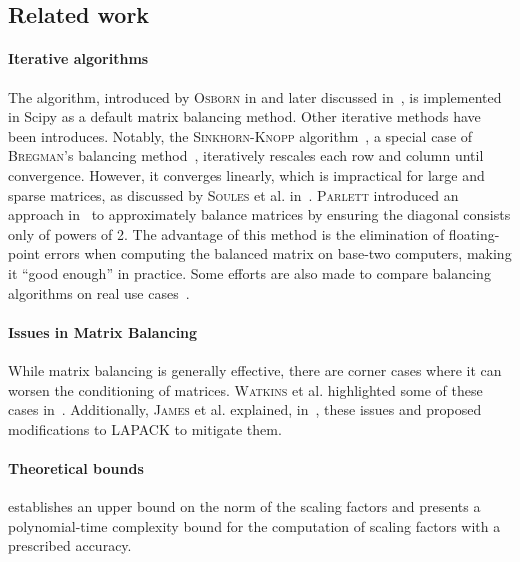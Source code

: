 
\subsection{Related work}

\paragraph*{Iterative algorithms} The  algorithm, introduced by \textsc{Osborn} in \cite{osborne1960pre} and later discussed in~\cite{parlett1971balancing}, is implemented in Scipy as a default matrix balancing method. Other iterative methods have been introduces. Notably, the \textsc{Sinkhorn-Knopp} algorithm~\cite{sinkhorn1967concerning}, a special case of \textsc{Bregman}’s balancing method~\cite{lamond1981bregman}, iteratively rescales each row and column until convergence. However, it converges linearly, which is impractical for large and sparse matrices, as discussed by \textsc{Soules} et al. in~\cite{soules1991rate}. \textsc{Parlett} introduced an approach in~\cite{parlett1971balancing} to approximately balance matrices by ensuring the diagonal consists only of powers of 2. The advantage of this method is the elimination of floating-point errors when computing the balanced matrix on base-two computers, making it ``good enough'' in practice. Some efforts are also made to compare balancing algorithms on real use cases~\cite{schneider1990comparative}.

\paragraph*{Issues in Matrix Balancing} While matrix balancing is generally effective, there are corner cases where it can worsen the conditioning of matrices. \textsc{Watkins} et al. highlighted some of these cases in~\cite{watkins2006case}. Additionally, \textsc{James} et al. explained, in~\cite{james2014matrix}, these issues and proposed modifications to LAPACK to mitigate them.

\paragraph*{Theoretical bounds}  \cite{kalantari1996complexity} establishes an upper bound on the norm of the scaling factors and presents a polynomial-time complexity bound for the computation of scaling factors with a prescribed accuracy.

